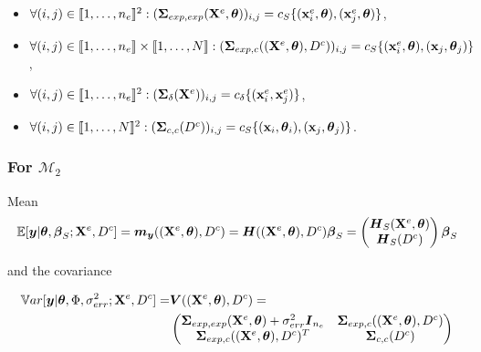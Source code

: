 \documentclass[nopagenumber,9pt]{beamer}
\begin{document}
\begin{frame}
 
  \begin{itemize}
\item $\forall (i,j) \in \llbracket1,\dots,n_e\rrbracket^2: (\boldsymbol{\Sigma}_{exp,exp}(\mathbf{X}^e,\boldsymbol{\theta}))_{i,j}=c_S\{(\mathbf{x}^e_i,\boldsymbol{\theta}),(\mathbf{x}^e_j,\boldsymbol{\theta})\}$,

\medskip
\item $\forall (i,j) \in \llbracket1,\dots,n_e\rrbracket\times\llbracket1,\dots,N\rrbracket: (\boldsymbol{\Sigma}_{exp,c}((\mathbf{X}^e,\boldsymbol{\theta}),D^c))_{i,j}=c_S\{(\mathbf{x}^e_i,\boldsymbol{\theta}),(\mathbf{x}_j,\boldsymbol{\theta}_j)\}$,

\medskip
\item $\forall (i,j)\in\llbracket1,\dots,n_e\rrbracket^2: (\boldsymbol{\Sigma}_{\delta}(\mathbf{X}^e))_{i,j}=c_{\delta}\{(\mathbf{x}^e_i,\mathbf{x}^e_j)\}$,

\medskip
\item $\forall (i,j)\in \llbracket1,\dots,N\rrbracket^2: (\boldsymbol{\Sigma}_{c,c}(D^c))_{i,j}=c_S\{(\mathbf{x}_i,\boldsymbol{\theta}_i),(\mathbf{x}_j,\boldsymbol{\theta}_j)\}$. \newline
\end{itemize}
 
\end{frame}


\begin{frame}
 \frametitle{For $\mathcal{M}_2$}
 Mean 
 \begin{equation*}
\mathbb{E}[\boldsymbol{y}|\boldsymbol{\theta},\boldsymbol{\beta}_S;\mathbf{X}^e,D^c]=\boldsymbol{m}_{\boldsymbol{y}}((\mathbf{X}^e,\boldsymbol{\theta}),D^c)=\boldsymbol{H}((\mathbf{X}^e,\boldsymbol{\theta}),D^c)\boldsymbol{\beta}_S=\begin{pmatrix}
\boldsymbol{H}_S(\mathbf{X}^e,\boldsymbol{\theta})\\
\boldsymbol{H}_S(D^c)
\end{pmatrix}\boldsymbol{\beta}_S
\label{eq:MeanFullLikelihood2}
\end{equation*}


\bigskip
and the covariance

\begin{equation*}
\begin{split}
\mathbb{V}ar[\boldsymbol{y}|\boldsymbol{\theta},\Phi,\sigma_{err}^2;\mathbf{X}^e,D^c]=&\boldsymbol{V}((\mathbf{X}^e,\boldsymbol{\theta}),D^c)=\\
&\begin{pmatrix}
\boldsymbol{\Sigma}_{exp,exp}(\mathbf{X}^e,\boldsymbol{\theta}) +\sigma_{err}^2\boldsymbol{I}_{n_e} & \boldsymbol{\Sigma}_{exp,c}((\mathbf{X}^e,\boldsymbol{\theta}),D^c)\\
\boldsymbol{\Sigma}_{exp,c}((\mathbf{X}^e,\boldsymbol{\theta}),D^c)^T & \boldsymbol{\Sigma}_{c,c}(D^c)
\end{pmatrix}
\label{eq:VarianceFullLikelihood1}
\end{split}
\end{equation*}
 
\end{frame}
\end{document}
